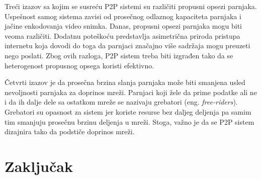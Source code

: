 \documentclass[12pt,oneside]{memoir}
\begin{document}
Treći izazov sa kojim se susreću P2P sistemi su različiti propusni opsezi parnjaka. Uspešnost samog sistema zavisi od prosečnog odlaznog kapaciteta parnjaka i jačine enkodovanja video snimka. Danas, propusni opsezi parnjaka mogu biti veoma različiti. Dodatnu poteškoću predstavlja asimetrična priroda pristupa internetu koja dovodi do toga da parnjaci značajno više sadržaja mogu preuzeti nego poslati. Zbog ovih razloga, P2P sistem treba biti izgrađen tako da se heterogenost propusnog opsega koristi efektivno.

Četvrti izazov je da prosečna brzina slanja parnjaka može biti smanjena usled nevoljnosti parnjaka za doprinos mreži. Parnjaci koji žele da prime podatke ali ne i da ih dalje dele sa ostatkom mreže se nazivaju grebatori (eng. \textit{free-riders}). Grebatori su opasnost za sistem jer koriste resurse bez daljeg deljenja pa samim tim smanjuju prosečnu brzinu deljenja u mreži. Stoga, važno je da se P2P sistem dizajnira tako da podstiče doprinos mreži.




\chapter{Zaključak}


\literatura

\backmatter

\end{document}
